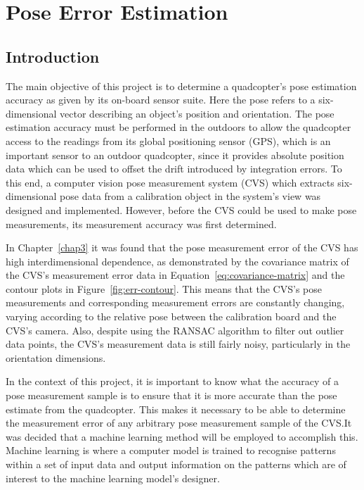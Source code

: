 \chapter{Pose Error Estimation}
\label{chap4}

\section{Introduction}

The main objective of this project is to determine a quadcopter's pose estimation accuracy as given by its on-board sensor suite. Here the pose refers to a six-dimensional vector describing an object's position and orientation. The pose estimation accuracy must be performed in the outdoors to allow the quadcopter access to the readings from its global positioning sensor (GPS), which is an important sensor to an outdoor quadcopter, since it provides absolute position data which can be used to offset the drift introduced by integration errors. To this end, a computer vision pose measurement system (CVS) which extracts six-dimensional pose data from a calibration object in the system's view was designed and implemented. However, before the CVS could be used to make pose measurements, its measurement accuracy was first determined. 

In Chapter~\ref{chap3} it was found that the pose measurement error of the CVS has high interdimensional dependence, as demonstrated by the covariance matrix of the CVS's measurement error data in Equation~\ref{eq:covariance-matrix} and the contour plots in Figure~\ref{fig:err-contour}. This means that the CVS's pose measurements and corresponding measurement errors are constantly changing, varying according to the relative pose between the calibration board and the CVS's camera. Also, despite using the RANSAC algorithm to filter out outlier data points, the CVS's measurement data is still fairly noisy, particularly in the orientation dimensions.

In the context of this project, it is important to know what the accuracy of a pose measurement sample is to ensure that it is more accurate than the pose estimate from the quadcopter. This makes it necessary to be able to determine the measurement error of any arbitrary pose measurement sample of the CVS.\@ It was decided that a machine learning method will be employed to accomplish this. Machine learning is where a computer model is trained to recognise patterns within a set of input data and output information on the patterns which are of interest to the machine learning model's designer. 

